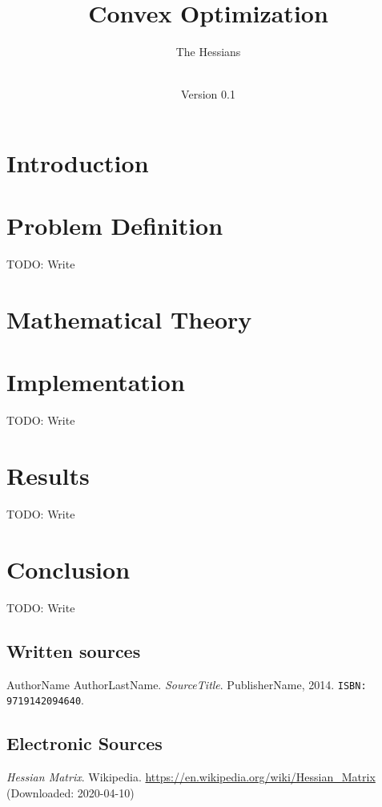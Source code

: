 \documentclass[notitlepage]{article}
\title{Convex Optimization\\}
\author{The Hessians}
\date{\documentdate\\Version 0.1} %
\begin{document}
\maketitle
\projectidentity
\authors

\newpage
\tableofcontents

\newpage
\listoffigures
{} 

\listoftables
{}

\newpage
{}

\section{Introduction}

\newpage

\section{Problem Definition}
TODO: Write
\newpage

\section{Mathematical Theory}

\newpage

\section{Implementation}
TODO: Write
\newpage

\section{Results}
TODO: Write
\newpage

\section{Conclusion}
TODO: Write
\newpage

\begin{thebibliography}{9}
	\subsection*{Written sources}
	AuthorName AuthorLastName.
	\textit{SourceTitle}.
	PublisherName, 2014.
	\texttt{ISBN: 9719142094640}.
	
	\subsection*{Electronic Sources}
	\textit{Hessian Matrix}.
	Wikipedia.
	\url{https://en.wikipedia.org/wiki/Hessian_Matrix} (Downloaded: 2020-04-10)

\end{thebibliography}
\end{document}
